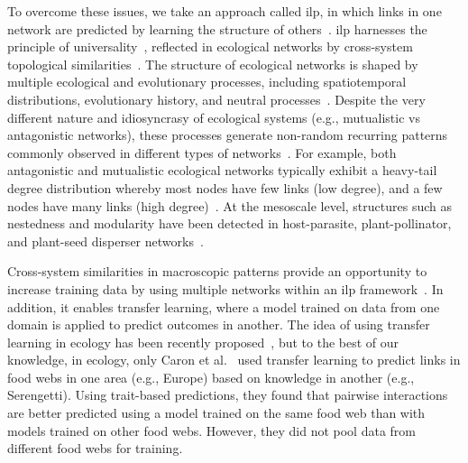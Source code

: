 \documentclass[oneside, a4paper, onecolumn, 11pt]{article}
\begin{document}
\begin{refsection}
To overcome these issues, we take an approach called \ac{ilp}, in which links in one network are predicted by learning the structure of others~\autocite{Galkin2022-il}. \ac{ilp} harnesses the principle of universality~\autocite{Watts1998-kd,Barabasi2021-fs,Barabasi1999-eg,Milo2002-nf}, reflected in ecological networks by cross-system topological similarities~\autocite{Fortuna2010-wb,Michalska-Smith2019-ap}. The structure of ecological networks is shaped by multiple ecological and evolutionary processes, including spatiotemporal distributions, evolutionary history, and neutral processes~\autocite{Vazquez2009-tr,Bascompte2014-nm,Segar2020-tq}. Despite the very different nature and idiosyncrasy of ecological systems (e.g., mutualistic vs antagonistic networks), these processes generate non-random recurring patterns commonly observed in different types of networks~\autocite{Bascompte2009-tx,Delmas2019-gk,Guimaraes2020-kh}. For example, both antagonistic and mutualistic ecological networks typically exhibit a heavy-tail degree distribution whereby most nodes have few links (low degree), and a few nodes have many links (high degree)~\autocite{Jordano2003-pa,Vazquez2005-np,Williams2011-yv}. At the mesoscale level, structures such as nestedness and modularity have been detected in host-parasite, plant-pollinator, and plant-seed disperser networks~\autocite{Bascompte2003-ad, Olesen2007-rl, Fortuna2010-wb, Krasnov2012-ss,Dallas2015-sd}. 

Cross-system similarities in macroscopic patterns provide an opportunity to increase training data by using multiple networks within an \ac{ilp} framework~\autocite{Gao2022-jd,Hao2020-le}. In addition, it enables transfer learning, where a model trained on data from one domain is applied to predict outcomes in another. The idea of using transfer learning in ecology has been recently proposed~\autocite{Strydom2023-nb}, but to the best of our knowledge, in ecology, only Caron et al.~\autocite{Caron2024-jf} used transfer learning to predict links in food webs in one area (e.g., Europe) based on knowledge in another (e.g., Serengetti). Using trait-based predictions, they found that pairwise interactions are better predicted using a model trained on the same food web than with models trained on other food webs. However, they did not pool data from different food webs for training. 


\end{refsection}
\end{document}
